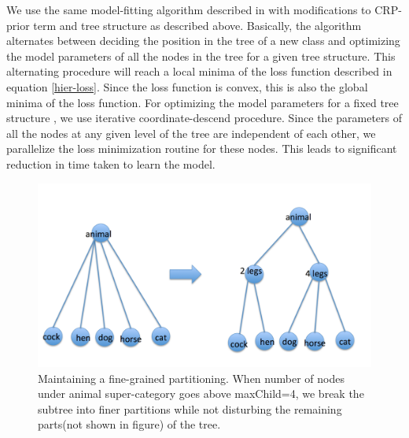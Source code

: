 \documentclass[10pt,twocolumn,letterpaper]{article}
\begin{document}
We use the same model-fitting algorithm described in \cite{ruslan} with modifications to CRP-prior term and tree structure as described above.
Basically, the algorithm alternates between deciding the position in the tree of a new class and optimizing the model parameters of all the nodes
in the tree for a given tree structure.  This alternating procedure will reach a local minima of the loss function 
described in equation \ref{hier-loss}. Since the loss function is convex, this is also the global minima of the loss function. 
For optimizing the model parameters for a fixed tree structure , we use iterative coordinate-descend procedure.
Since the parameters of all the nodes at any given level of the tree are independent of each other, we parallelize the loss minimization 
routine for these nodes. This leads to significant reduction in time taken to learn the model.

\begin{figure}[t]
  	\begin{center}
  		\includegraphics[width=0.8\linewidth]{split}
  	\end{center}
  	\caption{ Maintaining a fine-grained partitioning. When number of nodes under 
              animal super-category goes above maxChild=4, we break the subtree into 
              finer partitions while not disturbing the remaining parts(not shown in figure) 
              of the tree.  }
  	\label{fig:long}
  	\label{fig:onecol}
  \end{figure}
\end{document}
